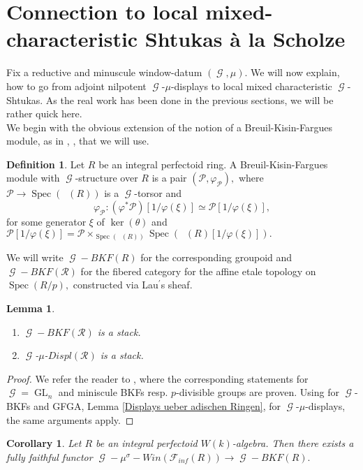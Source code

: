 \documentclass[a4paper,10,5 pt]{amsart}
\newtheorem{Lemma}[Satz]{Lemma}
\newtheorem{Corollary}[Satz]{Corollary}
\theoremstyle{definition}
\newtheorem{Definition}{Definition}
\DeclareMathOperator{\Spec}{Spec}
\DeclareMathOperator{\GL}{GL}
\DeclareMathOperator{\Ainf}{\mathbb{A}_{inf}}
\DeclareMathOperator{\G}{\mathcal{G}}
\begin{document}
\section{Connection to local mixed-characteristic Shtukas à la Scholze}
Fix a reductive and minuscule window-datum $(\G,\mu).$ We will now explain, how to go from adjoint nilpotent $\G$-$\mu$-displays to local mixed characteristic $\G$-Shtukas. As the real work has been done in the previous sections, we will be rather quick here.
\\
We begin with the obvious extension of the notion of a Breuil-Kisin-Fargues module, as in \cite{conjectures curve}, \cite{Lau perfektoid}, that we will use.
\begin{Definition}
Let $R$ be an integral perfectoid ring. A Breuil-Kisin-Fargues module with $\G$-structure over $R$ is a pair $(\mathcal{P},\varphi_{\mathcal{P}}),$ where $\mathcal{P}\rightarrow \Spec(\Ainf(R))$ is a $\G$-torsor and 
$$
\varphi_{\mathcal{P}}\colon (\varphi^{*}\mathcal{P})[1/\varphi(\xi)]\simeq \mathcal{P}[1/\varphi(\xi)],
$$
for some generator $\xi$ of $\ker(\theta)$ and $\mathcal{P}[1/\varphi(\xi)]=\mathcal{P}\times_{\Spec(\Ainf(R))} \Spec(\Ainf(R)[1/\varphi(\xi)]).$
\end{Definition}
We will write $\G-BKF(R)$ for the corresponding groupoid and  $\G-BKF(\mathcal{R})$ for the fibered category for the affine etale topology on $\Spec(R/p),$ constructed via Lau$^{\prime}$s sheaf. 
\begin{Lemma}\label{Displays sind ein Stack fuer Laus Garbe}
\begin{enumerate}
\item[(a):] $\G-BKF(\mathcal{R})$ is a stack.
\item[(b):] $\G$-$\mu$-$Displ(\mathcal{R})$ is a stack.
\end{enumerate}
\end{Lemma} 
\begin{proof}
We refer the reader to \cite[Lemma 10.9.]{Lau perfektoid}, where the corresponding statements for $\G=\GL_{n}$ and miniscule BKFs resp. $p$-divisible groups are proven. Using \cite[Lemma B.0.4.(b)]{BP} for $\G$-BKFs and GFGA, Lemma \ref{Displays ueber adischen Ringen}, for $\G$-$\mu$-displays, the same arguments apply.
\end{proof}
\begin{Corollary}
Let $R$ be an integral perfectoid $W(k)$-algebra. Then there exists a fully faithful functor
$
\G-\mu^{\sigma}-Win(\mathcal{F}_{inf}(R))\rightarrow \G-BKF(R).
$
\end{Corollary}
\end{document}
